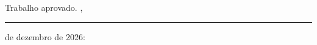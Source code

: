 %
% 
%
\begin{folhadeaprovacao}

  \begin{center}
    {\ABNTEXchapterfont\large\imprimirautor}

    \vspace*{\fill}\vspace*{\fill}
    \begin{center}
      \ABNTEXchapterfont\bfseries\Large\imprimirtitulo
    \end{center}
    \vspace*{\fill}
    
    \hspace{.45\textwidth}
    \begin{minipage}{.5\textwidth}
        \imprimirpreambulo
    \end{minipage}%
    \vspace*{\fill}
   \end{center}
        
   Trabalho aprovado. \imprimirlocal, \rule{1cm}{0.4pt} de dezembro de 2026:

      
   \begin{center}
    \vspace*{0.5cm}
    {\large\imprimirlocal}
    \par
    {\large\imprimirdata}
    \vspace*{1cm}
  \end{center}
  
\end{folhadeaprovacao}
